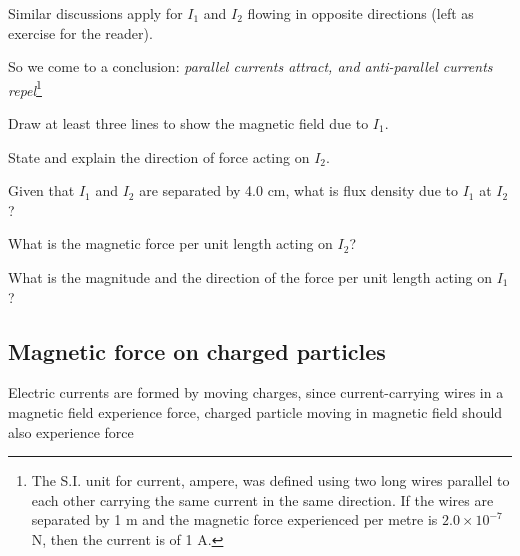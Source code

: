 \documentclass[a4paper,12pt]{book}
\newcounter{exercise}[chapter]
\begin{document}
Similar discussions apply for $I_1$ and $I_2$ flowing in opposite directions (left as exercise for the reader).

So we come to a conclusion: \emph{parallel currents attract, and anti-parallel currents repel}\footnote{The S.I. unit for current, ampere, was defined using two long wires parallel to each other carrying the same current in the same direction. If the wires are separated by 1 m and the magnetic force experienced per metre is $2.0\times10^{-7}$ N, then the current is of 1 A.}

\label{q-pwires}

\begin{figure}[htp]
\centering
{}
\end{figure}

\begin{compactenum}
\item[(a)] Draw at least three lines to show the magnetic field due to $I_1$.

\item[(b)] State and explain the direction of force acting on $I_2$.

\item[(c)] Given that $I_1$ and $I_2$ are separated by 4.0 cm, what is flux density due to $I_1$ at $I_2$?

\item[(d)]  What is the magnetic force per unit length acting on $I_2$?

\item[(e)] What is the magnitude and the direction of the force per unit length acting on $I_1$?
	
\end{compactenum}

\subsection{Magnetic force on charged particles}

Electric currents are formed by moving charges, since current-carrying wires in a magnetic field experience force, charged particle moving in magnetic field should also experience force
\end{document}
